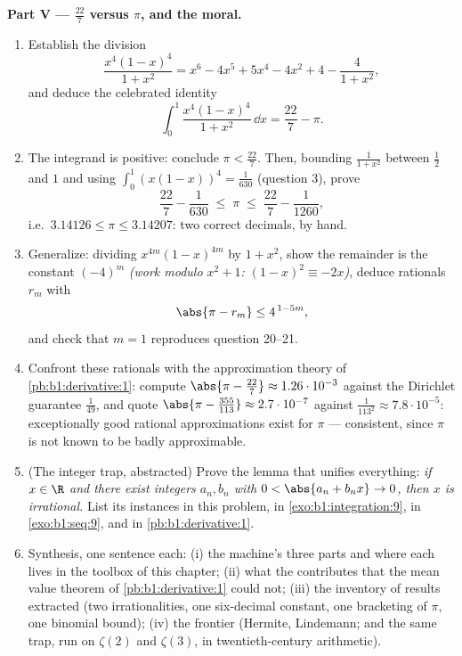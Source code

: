 \begin{problem}
\medskip
\noindent\textbf{Part V --- $\frac{22}{7}$ versus $\pi$, and the
moral.}
\begin{enumerate}[resume]
  \item Establish the  division
        \[
        \frac{x^4(1-x)^4}{1 + x^2}
        = x^6 - 4x^5 + 5x^4 - 4x^2 + 4 - \frac{4}{1 + x^2},
        \]
        and deduce the celebrated identity
        \[
        \int_0^1 \frac{x^4 (1-x)^4}{1 + x^2}\,\dd x
        = \frac{22}{7} - \pi .
        \]
  \item The integrand is positive: conclude $\pi <
        \frac{22}{7}$. Then, bounding $\frac{1}{1+x^2}$ between
        $\frac12$ and $1$ and using $\int_0^1 (x(1-x))^4 =
        \frac{1}{630}$ (question 3), prove
        \[
        \frac{22}{7} - \frac{1}{630} \;\leq\; \pi \;\leq\;
        \frac{22}{7} - \frac{1}{1260} ,
        \]
        i.e.\ $3.14126 \leq \pi \leq 3.14207$: two correct
        decimals, by hand.
  \item Generalize: dividing $x^{4m}(1-x)^{4m}$ by $1 + x^2$,
        show the remainder is the constant $(-4)^m$ \emph{(work
        modulo $x^2 + 1$: $(1-x)^2 \equiv -2x$)}, deduce
        rationals $r_m$ with
        \[
        \abs{\pi - r_m} \leq 4^{\,1 - 5m} ,
        \]
        and check that $m = 1$ reproduces question 20--21.
  \item Confront these rationals with the approximation theory
        of \cref{pb:b1:derivative:1}: compute $\abs{\pi -
        \frac{22}{7}} \approx 1.26\cdot10^{-3}$ against the
        Dirichlet guarantee $\frac{1}{49}$, and quote
        $\abs{\pi - \frac{355}{113}} \approx 2.7\cdot10^{-7}$
        against $\frac{1}{113^2} \approx 7.8\cdot10^{-5}$:
        exceptionally good rational approximations exist for
        $\pi$ --- consistent, since $\pi$ is not known to be
        badly approximable.
  \item (The integer trap, abstracted) Prove the lemma that
        unifies everything: \emph{if $x \in \R$ and there exist
        integers $a_n, b_n$ with $0 < \abs{a_n + b_n x} \to 0$,
        then $x$ is irrational.} List its instances in this
        problem, in \cref{exo:b1:integration:9}, in
        \cref{exo:b1:seq:9}, and in \cref{pb:b1:derivative:1}.
  \item Synthesis, one sentence each: (i) the machine's three
        parts and where each lives in the toolbox of this
        chapter; (ii) what the  contributes that the
        mean value theorem of \cref{pb:b1:derivative:1} could
        not; (iii) the inventory of results extracted (two
        irrationalities, one six-decimal constant, one
        bracketing of $\pi$, one binomial bound); (iv) the
        frontier (Hermite, Lindemann; and the same trap, run on
        $\zeta(2)$ and $\zeta(3)$, in twentieth-century
        arithmetic).
\end{enumerate}
\end{problem}
